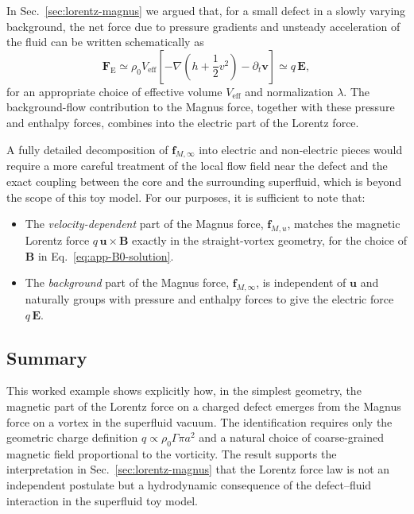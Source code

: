 \documentclass[11pt]{article}
\begin{document}
In Sec.~\ref{sec:lorentz-magnus} we argued that, for a small defect in a slowly varying background, the net force due to pressure gradients and unsteady acceleration of the fluid can be written schematically as
\begin{equation}
\mathbf{F}_{\mathrm{E}}
\simeq \rho_0 V_{\mathrm{eff}}
\left[-\nabla\left(h + \frac{1}{2}v^2\right) - \partial_t \mathbf{v}\right]
\simeq q\,\mathbf{E},
\end{equation}
for an appropriate choice of effective volume $V_{\mathrm{eff}}$ and normalization $\lambda$.  The background-flow contribution to the Magnus force, together with these pressure and enthalpy forces, combines into the electric part of the Lorentz force.

A fully detailed decomposition of $\mathbf{f}_{M,\infty}$ into electric and non-electric pieces would require a more careful treatment of the local flow field near the defect and the exact coupling between the core and the surrounding superfluid, which is beyond the scope of this toy model.  For our purposes, it is sufficient to note that:

\begin{itemize}
  \item The \emph{velocity-dependent} part of the Magnus force, $\mathbf{f}_{M,u}$, matches the magnetic Lorentz force $q\,\mathbf{u}\times\mathbf{B}$ exactly in the straight-vortex geometry, for the choice of $\mathbf{B}$ in Eq.~\eqref{eq:app-B0-solution}.
  \item The \emph{background} part of the Magnus force, $\mathbf{f}_{M,\infty}$, is independent of $\mathbf{u}$ and naturally groups with pressure and enthalpy forces to give the electric force $q\,\mathbf{E}$.
\end{itemize}

\subsection{Summary}

This worked example shows explicitly how, in the simplest geometry, the magnetic part of the Lorentz force on a charged defect emerges from the Magnus force on a vortex in the superfluid vacuum.  The identification requires only the geometric charge definition $q \propto \rho_0 \Gamma \pi a^2$ and a natural choice of coarse-grained magnetic field proportional to the vorticity.  The result supports the interpretation in Sec.~\ref{sec:lorentz-magnus} that the Lorentz force law is not an independent postulate but a hydrodynamic consequence of the defect--fluid interaction in the superfluid toy model.
\end{document}

